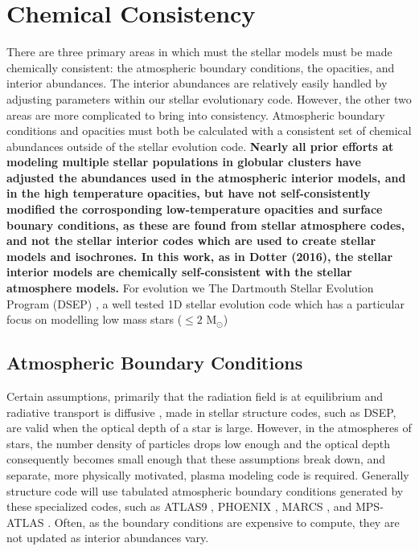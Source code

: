 \section{Chemical Consistency}\label{sec:const}
There are three primary areas in which must the stellar models must be made
chemically consistent: the atmospheric boundary conditions, the opacities, and
interior abundances. The interior abundances are relatively easily handled by
adjusting parameters within our stellar evolutionary code. However, the other
two areas are more complicated to bring into consistency. Atmospheric boundary
conditions and opacities must both be calculated with a consistent set of
chemical abundances outside of the stellar evolution code.
{\bf Nearly all prior efforts at modeling multiple stellar populations in
globular clusters have adjusted the abundances used in the atmospheric interior
models, and in the high temperature opacities, but have not self-consistently
modified the corrosponding low-temperature opacities and surface bounary
conditions, as these are found from stellar atmosphere codes, and not the
stellar interior codes which are used to create stellar models and isochrones.
In this work, as in Dotter (2016), the stellar interior models are chemically
self-consistent with the stellar atmosphere models.} For evolution we The Dartmouth Stellar
Evolution Program (DSEP) \citep{Dotter2008}, a well tested 1D stellar evolution
code which has a particular focus on modelling low mass stars ($\le 2$
M$_{\odot}$)

\subsection{Atmospheric Boundary Conditions}\label{sec:atm}
Certain assumptions, primarily that the radiation field is at equilibrium and
radiative transport is diffusive \citep{Salaris2005}, made in stellar structure
codes, such as DSEP, are valid when the optical depth of a star is large.
However, in the atmospheres of stars, the number density of particles drops low
enough and the optical depth consequently becomes small enough that these
assumptions break down, and separate, more physically motivated, plasma
modeling code is required. Generally structure code will use tabulated
atmospheric boundary conditions generated by these specialized codes, such as ATLAS9
\citep{Kurucz1993}, PHOENIX \citep{Husser2013}, MARCS \citep{Gustafsson2008},
and MPS-ATLAS \citep{Kostogryz2023}. Often, as the boundary conditions are
expensive to compute, they are not updated as interior abundances vary. 

